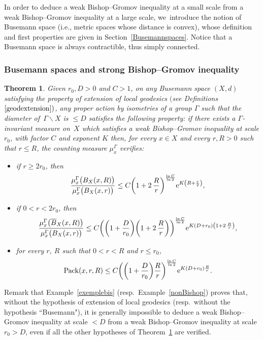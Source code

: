 \documentclass[10pt,a4paper]{amsart}
\numberwithin{equation}{section}
\newtheorem{theor}{Theorem}[section]
\begin{document}
In order to deduce a weak Bishop--Gromov inequality at a small scale from
a weak Bishop--Gromov
inequality at a large scale, we~introduce the notion of Busemann space (i.e., metric spaces whose distance is convex), whose definition and first
properties
are given in Section~\ref{Busemannspaces}. Notice that a Busemann space is always contractible, thus simply connected.


\subsubsection{Busemann spaces and strong Bishop--Gromov inequality}\label{strengthenBishop0}

\begin{theor}\label{strengthenBishop}
Given $r_0, D > 0$ and $C > 1$, on any Busemann space $(X,d)$ satisfying
the property of extension of local geodesics $($see Definitions~$\ref{geodextension})$, any proper action by isometries of a group $\Gamma$ such that the diameter of~$\Gamma \backslash X$ is $\le D$ satisfies the following property:
if there exists a $\Gamma$-invariant measure on~$X$ which satisfies a weak Bishop--Gromov inequality at scale $r_0$, with factor $C$
and exponent $K$ then, for every $x \in X$ and every $r, R> 0$ such that $r \le R$, the counting measure $\mu_{x}^{\Gamma}$ verifies:
\begin{itemize}\itemsep=0pt
\item[$(i)$]
if $r \ge 2 r_0 $, then
\[
\dfrac{\mu_{x}^{\Gamma} \big(B_X( x, R)\big)}{\mu_{x}^{\Gamma}
\big(B_X (x, r)\big)} \le C
\bigg(1 +2\,\dfrac{R}{r} \bigg)^{\frac{\ln C}{\ln 2}}{\rm e}^{K \left(R + \frac{r}{2}\right)},
\]
\item[$(ii)$]
if $0 < r <2 r_0$, then
\[
\dfrac{\mu_{x}^{\Gamma} \big(\overline B_X(x, R)\big)}{\mu_{x}^{\Gamma} \big(B_X (x, r)\big)} \le C \bigg(\bigg(1 + \dfrac{D}{r_0}\bigg)\bigg(1 +2\,\dfrac{R}{r}\bigg)\bigg)^{\frac{\ln C}{\ln 2}}
{\rm e}^{K (D+ r_0) \left(1 +2\,\frac{R}{r}\right)},
\]
\item[$(iii)$]
for every $r$, $R$ such that $0 < r < R$ and $r \le r_0$,
\[
{\rm Pack} (x, r, R) \le C \bigg(\bigg(1 + \dfrac{D}{r_0}\bigg) \frac{R}{r} \bigg)^{\frac{\ln C}{\ln 2}} {\rm e}^{K (D+ r_0) \frac{R}{r}}.
\]
\end{itemize}
\end{theor}

 Remark that Example~\ref{exemplebis} (resp.\ Example~\ref{nonBishop}) proves that, without the hypothesis of extension of local geodesics (resp.\ without
the hypothesis ``Busemann"), it is generally impossible to deduce a
weak Bishop--Gromov inequality at scale $< D$ from a weak Bishop--Gromov inequality
at scale $r_0 > D$, even if all the other hypotheses of Theorem~\ref{strengthenBishop} are verified.
\end{document}
